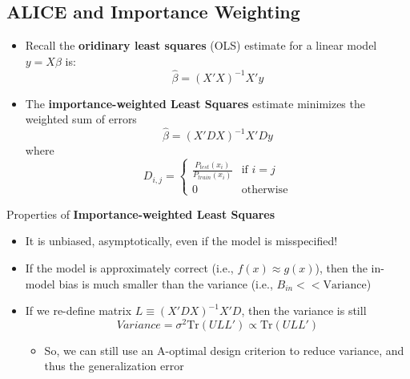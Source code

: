 \documentclass[10pt]{article}
\begin{document}
\subsection*{ALICE and Importance Weighting}
\begin{itemize}
	\item Recall the \textbf{oridinary least squares} (OLS) estimate for a linear model $y = X\beta$ is:
	\[\hat{\beta} = (X'X)^{-1} X' y\]
    \item The \textbf{importance-weighted Least Squares} estimate minimizes the weighted sum of errors
    \[\hat{\beta} = (X' DX)^{-1} X' Dy\]
    where 
    \[D_{i, j} = \begin{cases} \frac{P_{test}(x_i)}{P_{train}(x_i)} & \text{if } i = j \\ 0 & \text{otherwise} \end{cases}\]
\end{itemize}
Properties of \textbf{Importance-weighted Least Squares}
\begin{itemize}
	\item It is unbiased, asymptotically, even if the model is misspecified!
	\item If the model is approximately correct (i.e., $f(x) \approx g(x)$), then the in-model bias is much smaller than the variance (i.e., $B_{in} << \text{Variance}$)
	\item If we re-define matrix $L \equiv (X' D X)^{-1} X' D$, then the variance is still
	\[Variance = \sigma^2 \text{Tr}(ULL') \propto \text{Tr}(ULL')\]
    \begin{itemize}
	    \item So, we can still use an A-optimal design criterion to reduce variance, and thus the generalization error
    \end{itemize}
\end{itemize}
\end{document}
